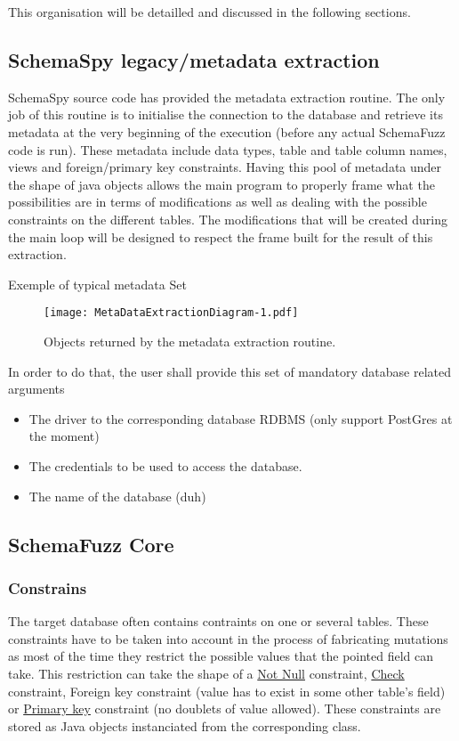 \documentclass{article}
\begin{document}
\begin{empfile}
This organisation will be detailled and discussed in the following sections.
		\subsection{SchemaSpy legacy/metadata extraction}
SchemaSpy source code has provided the metadata extraction routine. The only job of this routine is to initialise the connection to the database and retrieve its metadata at the very beginning of the execution (before any actual SchemaFuzz code is run). These metadata include data types, table and table column names, views and foreign/primary key constraints. Having this pool of metadata under the shape of java objects allows the main program to properly frame what the possibilities are in terms of modifications as well as dealing with the possible constraints on the different tables. The modifications that will be created during the main loop will be designed to respect the frame built for the result of this extraction.

Exemple of typical metadata Set 


\begin{figure} [htbp]
\centering
\texttt{[image: MetaDataExtractionDiagram-1.pdf]}
\caption{Objects returned by the metadata extraction routine.}
\end{figure}

In order to do that, the user shall provide this set of mandatory database related arguments
			\begin{itemize}
 				\item The driver to the corresponding database RDBMS (only support PostGres at the moment)
 				\item The credentials to be used to access the database.
 				\item The name of the database (duh)
			\end{itemize}
		\subsection{SchemaFuzz Core}		
			\subsubsection{Constrains}
The target database often contains contraints on one or several tables. These constraints have to be taken into account in the process of fabricating mutations as most of the time they restrict the possible values that the pointed field can take. This restriction can take the shape of a \underline {Not Null} constraint, \underline{Check} constraint, {Foreign key} constraint (value has to exist in some other table's field) or \underline{Primary key} constraint (no doublets of value allowed). These constraints are stored as Java objects instanciated from the corresponding class.


\end{empfile}
\end{document}

